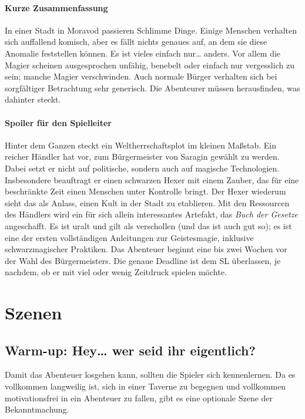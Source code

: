 \documentclass[a4paper,10pt]{scrartcl}
\begin{document}
\paragraph{Kurze Zusammenfassung}

In einer Stadt in Moravod passieren Schlimme Dinge. Einige Menschen
verhalten sich auffallend komisch, aber es fällt nichts genaues auf, an
dem sie diese Anomalie feststellen können. Es ist vieles einfach nur…
anders. Vor allem die Magier scheinen ausgesprochen unfähig, benebelt
oder einfach nur vergesslich zu sein; manche Magier verschwinden. Auch
normale Bürger verhalten sich bei sorgfältiger Betrachtung sehr
generisch. Die Abenteurer müssen herausfinden, was dahinter steckt.

\paragraph{Spoiler für den Spielleiter}

Hinter dem Ganzen steckt ein Weltherrschaftsplot im kleinen Maßstab.
Ein reicher Händler hat vor, zum Bürgermeister von Saragin gewählt zu
werden.  Dabei setzt er nicht auf politische, sondern auch auf magische
Technologien. Insbesondere beauftragt er einen schwarzen Hexer mit einem
Zauber, das für eine beschränkte Zeit einen Menschen unter Kontrolle
bringt. Der Hexer wiederum sieht das als Anlass, einen Kult in der Stadt
zu etablieren. Mit den Ressourcen des Händlers wird ein für sich allein
interessantes Artefakt, das \emph{Buch der Gesetze} angeschafft. Es ist
uralt und gilt als verschollen (und das ist auch gut so); es ist eine
der ersten vollständigen Anleitungen zur Geistesmagie, inklusive
schwarzmagischer Praktiken. Das Abenteuer beginnt eine bis zwei Wochen
vor der Wahl des Bürgermeisters. Die genaue Deadline ist dem SL
überlassen, je nachdem, ob er mit viel oder wenig Zeitdruck spielen
möchte.

\section{Szenen}

\subsection{Warm-up: Hey… wer seid ihr eigentlich?}

Damit das Abenteuer losgehen kann, sollten die Spieler sich
kennenlernen. Da es vollkommen langweilig ist, sich in einer Taverne zu
begegnen und vollkommen motivationsfrei in ein Abenteuer zu fallen, gibt
es eine optionale Szene der Bekanntmachung.
\end{document}
